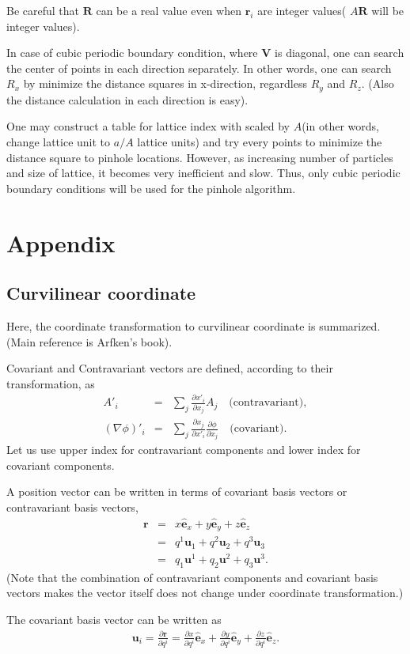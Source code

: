 \documentclass[10pt]{book}
\def\bm{\boldsymbol}
\newcommand{\bea}{\begin{eqnarray}}
\newcommand{\eea}{\end{eqnarray}}
\newcommand{\no}{\nonumber \\}
\newcommand{\del}{\partial}
\def\vr{{\bm r}}
\begin{document}
Be careful that ${\bm R}$ can be a real value 
even when $\vr_i$ are integer values( $A{\bm R}$ will be integer values).

In case of cubic periodic boundary condition, where ${\bm V}$ is diagonal, 
one can search the center of points in each direction separately.
In other words, one can search $R_x$ by minimize the distance squares
in x-direction, regardless $R_y$ and $R_z$.   
(Also the distance calculation in each direction is easy). 

One may construct a table for lattice index with scaled by $A$(in other words, change 
lattice unit to $a/A$ lattice units) and try every points to minimize the distance square
to pinhole locations. However, as increasing number of particles and size of lattice,
it becomes very inefficient and slow.  Thus, 
only cubic periodic boundary conditions will be used for the pinhole algorithm.  

\chapter{Appendix}
\section{Curvilinear coordinate}
Here, the coordinate transformation to curvilinear coordinate is summarized. 
(Main reference is Arfken's book).

Covariant and Contravariant vectors are defined,
according to their transformation, as
\bea 
A'_i &=& \sum_j \frac{\del x'_i}{\del x_j} A_j \quad \mbox{(contravariant)},\no 
(\nabla\phi)'_i&=& \sum_{j} \frac{\del x_j}{\del x'_i}\frac{\del \phi}{\del x_j}
\quad \mbox{(covariant)}.
\eea 
Let us use upper index for contravariant components and lower index for covariant components.

A position vector can be written in terms of covariant basis vectors
or contravariant basis vectors,
\bea 
{\bm r}&=&x \hat{\bm e}_x+y\hat{\bm e}_y+z\hat{\bm e}_z \no 
&=&q^1 {\bm u}_1+q^2 {\bm u}_2+q^3 {\bm u}_3  \no 
&=&q_1 {\bm u}^1+q_2 {\bm u}^2+q_3 {\bm u}^3. 
\eea 
(Note that the combination of contravariant components and covariant basis vectors makes
the vector itself does not change under coordinate transformation.)

The covariant basis vector can be written as 
\bea 
{\bm u}_i= \frac{\del \vr}{\del q^i}
=\frac{\del x}{\del q^i}\hat{\bm e}_x+\frac{\del y}{\del q^i}\hat{\bm e}_y
+\frac{\del z}{\del q^i}\hat{\bm e}_z .        
\eea 
\end{document}
